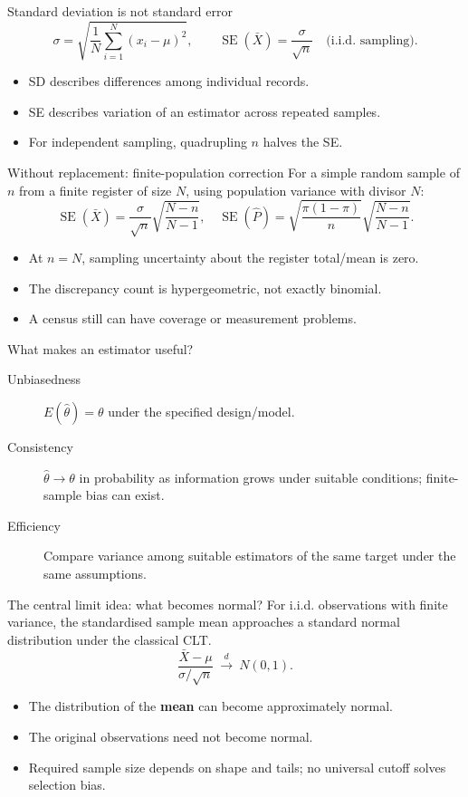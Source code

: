 \begin{frame}{Standard deviation is not standard error}
\[
\sigma=\sqrt{\frac1N\sum_{i=1}^N(x_i-\mu)^2},\qquad
\operatorname{SE}(\bar X)=\frac{\sigma}{\sqrt n}\quad\text{(i.i.d. sampling)}.
\]
\begin{itemize}\item SD describes differences among individual records.\item SE describes variation of an estimator across repeated samples.\item For independent sampling, quadrupling $n$ halves the SE.\end{itemize}
\end{frame}
\begin{frame}{Without replacement: finite-population correction}
For a simple random sample of $n$ from a finite register of size $N$, using population variance with divisor $N$:
\[
\operatorname{SE}(\bar X)=\frac{\sigma}{\sqrt n}\sqrt{\frac{N-n}{N-1}},\quad
\operatorname{SE}(\hat P)=\sqrt{\frac{\pi(1-\pi)}n}\sqrt{\frac{N-n}{N-1}}.
\]
\begin{itemize}\item At $n=N$, sampling uncertainty about the register total/mean is zero.\item The discrepancy count is hypergeometric, not exactly binomial.\item A census still can have coverage or measurement problems.\end{itemize}
\end{frame}
\begin{frame}{What makes an estimator useful?}
\begin{description}
\item[Unbiasedness] $E(\hat\theta)=\theta$ under the specified design/model.
\item[Consistency] $\hat\theta\to\theta$ in probability as information grows under suitable conditions; finite-sample bias can exist.
\item[Efficiency] Compare variance among suitable estimators of the same target under the same assumptions.
\end{description}
\end{frame}
\begin{frame}{The central limit idea: what becomes normal?}
For i.i.d. observations with finite variance, the standardised sample mean approaches a standard normal distribution under the classical CLT.
\[
\frac{\bar X-\mu}{\sigma/\sqrt n}\ \xrightarrow{d}\ N(0,1).
\]
\begin{itemize}\item The distribution of the \textbf{mean} can become approximately normal.\item The original observations need not become normal.\item Required sample size depends on shape and tails; no universal cutoff solves selection bias.\end{itemize}
\end{frame}
